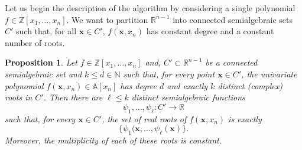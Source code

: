 \documentclass[
]{book}
\newtheorem{proposition}{Proposition}[chapter]
\theoremstyle{definition}
\theoremstyle{definition}
\theoremstyle{definition}
\theoremstyle{definition}
\theoremstyle{remark}
\begin{document}
Let us begin the description of the algorithm by considering a single polynomial \(f \in \mathbb{Z}[x_1,\ldots,x_n]\).
We want to partition \(\mathbb{R}^{n-1}\) into connected semialgebraic sets \(C'\) such that, for all \(\mathbf{x} \in C'\), \(f(\mathbf{x},x_n)\) has constant degree and a constant number of roots.

\begin{proposition}
\protect\hypertarget{prp:coste-polynomial-to-cell}{}\label{prp:coste-polynomial-to-cell}\citep[Proposition 2.16]{coste2000}
Let \(f \in \mathbb{Z}[x_1,\ldots,x_n]\) and, \(C' \subset \mathbb{R}^{n-1}\) be a connected semialgebraic set and \(k \le d \in \mathbb{N}\) such that, for every point \(\mathbf{x} \in C'\), the univariate polynomial \(f(\mathbf{x},x_n) \in \mathbb{A}[x_n]\) has degree \(d\) and exactly \(k\) distinct (complex) roots in \(C'\).
Then there are \(\ell \le k\) distinct semialgebraic functions
\[\psi_1,\ldots,\psi_\ell : C' \to \mathbb{R}
\]
such that, for every \(\mathbf{x} \in C'\), the set of real roots of \(f(\mathbf{x},x_n)\) is exactly
\[\{ \psi_1(\mathbf{x}, \ldots, \psi_\ell(\mathbf{x}) \}.\]
Moreover, the multiplicity of each of these roots is constant.
\end{proposition}
\end{document}
